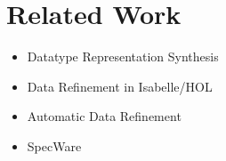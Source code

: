 \section{Related Work}
\begin{itemize}
\item Datatype Representation Synthesis
\item Data Refinement in Isabelle/HOL
\item Automatic Data Refinement
\item SpecWare
\end{itemize}
